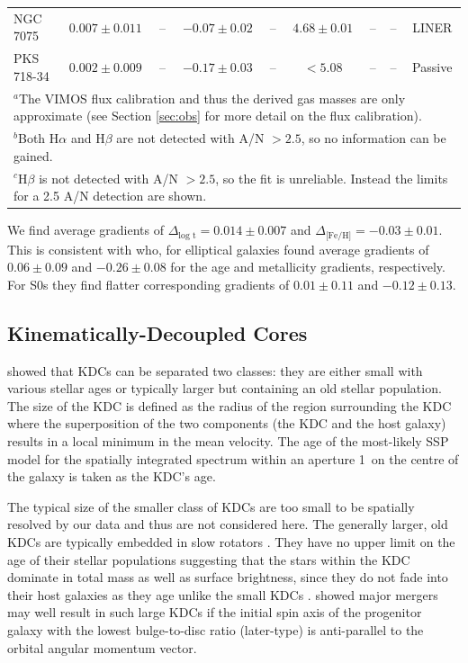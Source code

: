 \documentclass[a4paper,fleqn,usenatbib]{mnras}
\begin{document}
\begin{table}
\begin{tabular}{l c c c c c c c c}
					NGC 7075 	& $0.007 \pm 0.011$ & -- & $-0.07 \pm 0.02$ & -- & $4.68 \pm 0.01$	& -- 		& -- & LINER \\
					PKS 718-34  & $0.002 \pm 0.009$ & -- & $-0.17 \pm 0.03$ & -- & $< 5.08$	 		& -- 		& -- & Passive \\
				\hline
				\hline
				\multicolumn{9}{L{.95\linewidth}}{$^{a}$The VIMOS flux calibration and thus the derived gas masses are only approximate (see Section \ref{sec:obs} for more detail on the flux calibration).} \\
				\multicolumn{9}{L{.95\linewidth}}{$^{b}$Both H$\alpha$ and H$\beta$ are not detected with A/N $>2.5$, so no information can be gained.} \\
				\multicolumn{9}{L{.95\linewidth}}{$^{c}$H$\beta$ is not detected with A/N $> 2.5$, so the fit is unreliable. Instead the limits for a 2.5 A/N detection are shown.}
			\end{tabular}
		\end{table}

		We find average gradients of $\Delta_\text{log t} = 0.014\pm0.007$ and $\Delta_\text{[Fe/H]} = -0.03\pm0.01$. This is consistent with \citet{Koleva2011} who, for elliptical galaxies found average gradients of $0.06\pm0.09$ and $-0.26\pm0.08$ for the age and metallicity gradients, respectively. For S0s they find flatter corresponding gradients of $0.01\pm0.11$ and $-0.12\pm0.13$. 

	\subsection{Kinematically-Decoupled Cores}
		\label{subsec:popKDC}
		\citet{Kuntschner2010} showed that KDCs can be separated two classes: they are either small with various stellar ages or typically larger but containing an old stellar population. The size of the KDC is defined as the radius of the region surrounding the KDC where the superposition of the two components (the KDC and the host galaxy) results in a local minimum in the mean velocity. The age of the most-likely SSP model for the spatially integrated spectrum within an aperture 1\arcsec\ on the centre of the galaxy is taken as the KDC's age.

		The typical size of the smaller class of KDCs are too small to be spatially resolved by our data and thus are not considered here. The generally larger, old KDCs are typically embedded in slow rotators \citep{Kuntschner2010}. They have no upper limit on the age of their stellar populations suggesting that the stars within the KDC dominate in total mass as well as surface brightness, since they do not fade into their host galaxies as they age unlike the small KDCs \citep{Kuntschner2010}. \citet{Bois2011} showed major mergers may well result in such large KDCs if the initial spin axis of the progenitor galaxy with the lowest bulge-to-disc ratio (later-type) is anti-parallel to the orbital angular momentum vector. 
\end{document}

